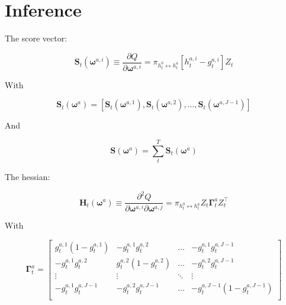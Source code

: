 \documentclass[12pt]{article}
\newcommand{\gateprod}[2]{\pi_{#1 \longleftrightarrow #2}}
\begin{document}
\section{Inference} \label{sec:Inference}

The score vector:

\begin{equation} \label{eq:gateScore}
  \boldsymbol{S}_{t}(\boldsymbol{\omega}^{a, i}) \equiv \frac{\partial Q}{\partial \boldsymbol{\omega}^{a,i}} = \gateprod{h^{0}_{t}}{h^{a}_{t}} \left[h^{a, i}_{t} - g^{a, i}_{t} \right] Z_{t}
\end{equation}

With

\begin{equation}
  \boldsymbol{S}_{t}(\boldsymbol{\omega}^{a}) = \left[\boldsymbol{S}_{t}(\boldsymbol{\omega}^{a, 1}),
                                                      \boldsymbol{S}_{t}(\boldsymbol{\omega}^{a, 2}),
                                                      \hdots, 
                                                      \boldsymbol{S}_{t}(\boldsymbol{\omega}^{a, J - 1})\right]
\end{equation}

And

\begin{equation}
  \boldsymbol{S}(\boldsymbol{\omega}^{a}) = \sum_{t}^{T} \boldsymbol{S}_{t}(\boldsymbol{\omega}^{a})
\end{equation}

\bigskip




The hessian:
\newcommand{\bw}[1]{\boldsymbol{\omega}^{#1}}
\newcommand{\Ht}[1]{\mathbf{H}_{t}(#1)}
\newcommand{\HH}[1]{\boldsymbol{H}(#1)}
\newcommand{\HI}[1]{\boldsymbol{H}^{-1}(#1)}

\begin{equation} \label{eq:nodehessian}
  \Ht{\bw{a}} \equiv \frac{\partial^{2} Q}{\partial \boldsymbol{\omega}^{a,i} \partial \boldsymbol{\omega}^{a,j}} = \gateprod{h^{0}_{t}}{h^{a}_{t}} Z_{t} \boldsymbol{\Gamma}^{a}_{t}  Z_{t}^\top
\end{equation}

With

\begin{equation}
  \boldsymbol{\Gamma}^{a}_{t} = \begin{bmatrix}
  g_{t}^{a,1}(1-g_{t}^{a,1}) & -g_{t}^{a,1}g_{t}^{a,2}    & \dots  & -g_{t}^{a,1}g_{t}^{a,J-1}       \\
  -g_{t}^{a,1}g_{t}^{a,2}    & g_{t}^{a,2}(1-g_{t}^{a,2}) & \dots  & -g_{t}^{a,2}g_{t}^{a,J-1}       \\
  \vdots                     &  \vdots                    & \ddots & \vdots                 \\
  -g_{t}^{a,1}g_{t}^{a,J-1}  & -g_{t}^{a,2}g_{t}^{a,J-1}  & \dots  & -g_{t}^{a,J-1}(1-g_{t}^{a,J-1}) \\
    \end{bmatrix}
\end{equation}
\end{document}
